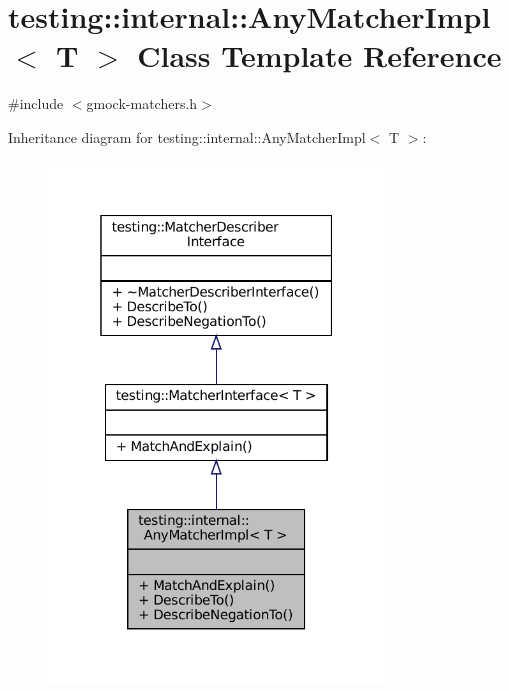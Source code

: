 \hypertarget{classtesting_1_1internal_1_1AnyMatcherImpl}{}\section{testing\+:\+:internal\+:\+:Any\+Matcher\+Impl$<$ T $>$ Class Template Reference}
\label{classtesting_1_1internal_1_1AnyMatcherImpl}


{\ttfamily \#include $<$gmock-\/matchers.\+h$>$}



Inheritance diagram for testing\+:\+:internal\+:\+:Any\+Matcher\+Impl$<$ T $>$\+:
\nopagebreak
\begin{figure}[H]
\begin{center}
\leavevmode
\includegraphics[width=253pt]{classtesting_1_1internal_1_1AnyMatcherImpl__inherit__graph}
\end{center}
\end{figure}


